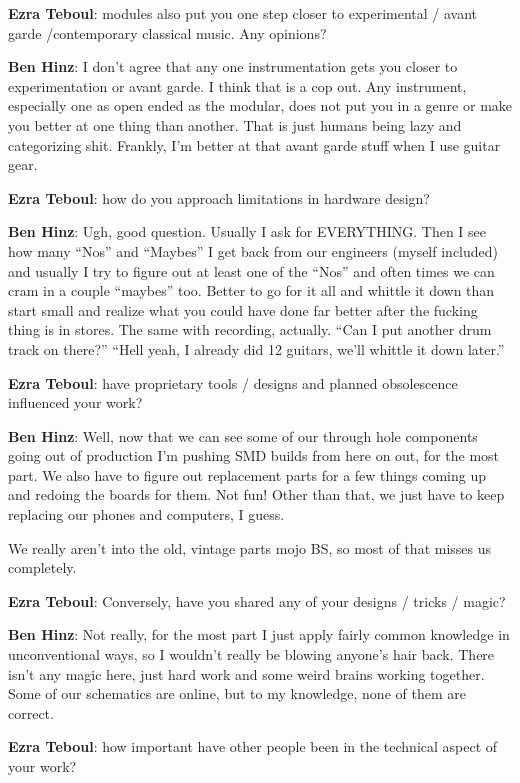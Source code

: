 \textbf{Ezra Teboul}: modules also put you one step closer to experimental / avant garde /contemporary classical music. Any opinions? 

\textbf{Ben Hinz}: I don’t agree that any one instrumentation gets you closer to experimentation or avant garde.  I think that is a cop out.  Any instrument, especially one as open ended as the modular, does not put you in a genre or make you better at one thing than another. That is just humans being lazy and categorizing shit. Frankly, I'm better at that avant garde stuff when I use guitar gear.

\textbf{Ezra Teboul}: how do you approach limitations in hardware design? 

\textbf{Ben Hinz}: Ugh, good question. Usually I ask for EVERYTHING. Then I see how many ``Nos'' and ``Maybes'' I get back from our engineers (myself included) and usually I try to figure out at least one of the ``Nos'' and often times we can cram in a couple ``maybes'' too. Better to go for it all and whittle it down than start small and realize 
what you could have done far better after the fucking thing is in stores. The same with recording, actually. ``Can I put another drum track on there?'' ``Hell yeah, I already did 12 guitars, we'll whittle it down later.''

\textbf{Ezra Teboul}: have proprietary tools / designs and planned obsolescence influenced your work? 

\textbf{Ben Hinz}: Well, now that we can see some of our through hole components going out of production I'm pushing SMD builds from here on out, for the most part. We also have to figure out replacement parts for a few things coming up and redoing the boards for them. Not fun! Other than that, we just have to keep replacing our phones and computers, I guess.  

We really aren’t into the old, vintage parts mojo BS, so most of that misses us completely.

\textbf{Ezra Teboul}: Conversely, have you shared any of your designs / tricks / magic? 

\textbf{Ben Hinz}: Not really, for the most part I just apply fairly common knowledge in unconventional ways, so I wouldn't really be blowing anyone's hair back. There isn’t any magic here, just hard work and some weird brains working together. Some of our schematics are online, but to my knowledge, none of them are correct. 

\textbf{Ezra Teboul}: how important have other people been in the technical aspect of your work? 

